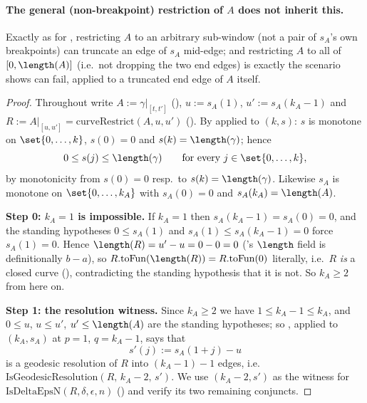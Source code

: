 \begin{lemma}
  \paragraph{The general (non-breakpoint) restriction of $A$ does not inherit this.} Exactly as for
  , restricting $A$ to an arbitrary sub-window (not a pair
  of $s_A$'s own breakpoints) can truncate an edge of $s_A$ mid-edge; and restricting $A$ to all of
  $[0,\length(A)]$ (i.e.\ not dropping the two end edges) is exactly the scenario
   shows can fail, applied to a truncated end edge of $A$
  itself.
\end{lemma}
\begin{proof}
  Throughout write $A := \gamma|_{[t,t']}$ (), $u := s_A(1)$, $u' := s_A(k_A-1)$
  and $R := A|_{[u,u']} = \mathrm{curveRestrict}(A,u,u')$ (). By
   applied to $(k,s)$: $s$ is monotone on $\set{0,\dots,k}$,
  $s(0)=0$ and $s(k)=\length(\gamma)$; hence
  \begin{equation}\label{ADEN-srange}
    0 \le s(j) \le \length(\gamma) \qquad \text{for every } j \in \set{0,\dots,k},
  \end{equation}
  by monotonicity from $s(0)=0$ resp.\ to $s(k)=\length(\gamma)$. Likewise $s_A$ is monotone on
  $\set{0,\dots,k_A}$ with $s_A(0)=0$ and $s_A(k_A)=\length(A)$.

  \textbf{Step 0: $k_A=1$ is impossible.} If $k_A=1$ then $s_A(k_A-1)=s_A(0)=0$, and the standing
  hypotheses $0\le s_A(1)$ and $s_A(1)\le s_A(k_A-1)=0$ force $s_A(1)=0$. Hence
  $\length(R)=u'-u=0-0=0$ ('s $\length$ field is definitionally $b-a$), so
  $R.\mathrm{toFun}(\length(R)) = R.\mathrm{toFun}(0)$ literally, i.e.\ $R$ \emph{is} a closed
  curve (), contradicting the standing hypothesis that it is not. So
  $k_A\ge2$ from here on.

  \textbf{Step 1: the resolution witness.} Since $k_A\ge2$ we have $1\le k_A-1\le k_A$, and
  $0\le u$, $u\le u'$, $u'\le\length(A)$ are the standing hypotheses; so
  , applied to $(k_A,s_A)$ at $p=1$, $q=k_A-1$, says that
  \[
    s'(j) := s_A(1+j) - u
  \]
  is a geodesic resolution of $R$ into $(k_A-1)-1$ edges, i.e.\
  $\mathrm{IsGeodesicResolution}(R,\,k_A-2,\,s')$. We use $(k_A-2,s')$ as the witness for
  $\mathrm{IsDeltaEpsN}(R,\delta,\epsilon,n)$ (\noderef{IsDeltaEpsN}) and verify its two remaining
  conjuncts.


\end{proof}
